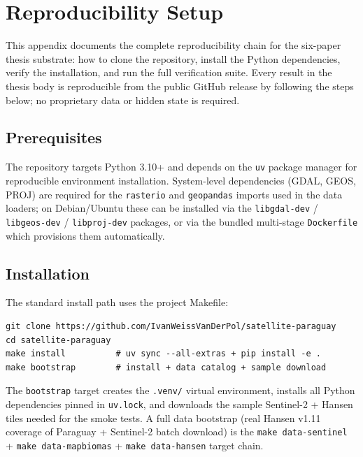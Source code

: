 %
%

\chapter{Reproducibility Setup}
\label{ch:appendix:setup}

This appendix documents the complete reproducibility chain for the
six-paper thesis substrate: how to clone the repository, install the
Python dependencies, verify the installation, and run the full
verification suite. Every result in the thesis body is reproducible
from the public GitHub release by following the steps below; no
proprietary data or hidden state is required.

\section{Prerequisites}

The repository targets Python 3.10+ and depends on the
\texttt{uv} package manager for reproducible environment installation.
System-level dependencies (GDAL, GEOS, PROJ) are required for the
\texttt{rasterio} and \texttt{geopandas} imports used in the data
loaders; on Debian/Ubuntu these can be installed via the
\texttt{libgdal-dev} / \texttt{libgeos-dev} / \texttt{libproj-dev}
packages, or via the bundled multi-stage \texttt{Dockerfile}
which provisions them automatically.

\section{Installation}

The standard install path uses the project Makefile:

\begin{verbatim}
git clone https://github.com/IvanWeissVanDerPol/satellite-paraguay
cd satellite-paraguay
make install          # uv sync --all-extras + pip install -e .
make bootstrap        # install + data catalog + sample download
\end{verbatim}

The \texttt{bootstrap} target creates the \texttt{.venv/} virtual
environment, installs all Python dependencies pinned in
\texttt{uv.lock}, and downloads the sample Sentinel-2 + Hansen tiles
needed for the smoke tests. A full data bootstrap (real Hansen
v1.11 coverage of Paraguay + Sentinel-2 batch download) is the
\texttt{make data-sentinel} + \texttt{make data-mapbiomas} +
\texttt{make data-hansen} target chain.

